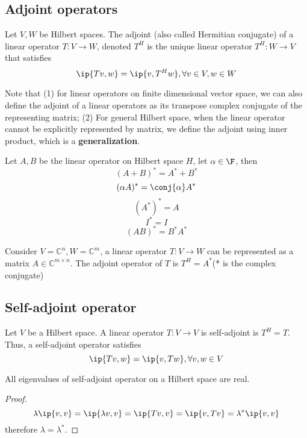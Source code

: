 \begin{refsection}
\subsection{Adjoint operators}
\begin{definition}
\cite[151]{debnath2005hilbert}
Let $V,W$ be Hilbert spaces. The adjoint (also called Hermitian conjugate) of a linear operator $T:V \rightarrow W$, denoted $T^H$ is the unique linear operator $T^H:W\rightarrow V$ that satisfies $$\ip{Tv,w}=\ip{v,T^Hw},\forall v\in V, w\in W$$
\end{definition}

\begin{remark}
Note that (1)  for linear operators on finite dimensional vector space, we  can also define the adjoint of a linear operators as its transpose complex conjugate of the representing matrix; (2) For general Hilbert space, when the linear operator cannot be explicitly represented by matrix, we define the adjoint using inner product, which is a \textbf{generalization}. 
\end{remark}

\begin{lemma}
\cite[151]{debnath2005hilbert}
Let $A,B$ be the linear operator on Hilbert space $H$, let $\alpha \in \F$, then
$$(A + B)^* = A^* + B^*$$
$$(\alpha A)^* = \conj{\alpha} A^*$$
$$(A^*)^* = A$$
$$I^* = I$$
$$(AB)^* = B^*A^*$$
\end{lemma}



\begin{remark}
Consider $V=\mathbb{C}^n,W=\mathbb{C}^m$, a linear operator $T:V\rightarrow W$ can be represented as a matrix $A\in \mathbb{C}^{m\times n}$. The adjoint operator of $T$ is $T^H=A^*$(* is the complex conjugate)
\end{remark}

\subsection{Self-adjoint operator}
\begin{definition}
Let $V$ be a Hilbert space. A linear operator $T:V\rightarrow V$ is self-adjoint is $T^H=T$. Thus, a self-adjoint operator satisfies
$$\ip{Tv,w}=\ip{v,Tw},\forall v,w \in V$$
\end{definition}

\begin{theorem}
\cite[182]{debnath2005hilbert}All eigenvalues of self-adjoint operator on a Hilbert space are real.
\end{theorem}
\begin{proof}
$$\lambda\ip{v,v}=\ip{\lambda v,v}=\ip{Tv,v} =\ip{v,Tv}=\lambda^*\ip{v,v}$$
therefore $\lambda = \lambda^*$.	
\end{proof}



\end{refsection}
